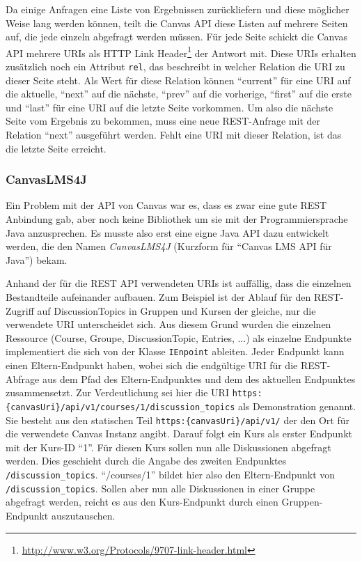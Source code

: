 Da einige Anfragen eine Liste von Ergebnissen zurückliefern und diese möglicher Weise lang werden können, teilt die Canvas API diese Listen auf mehrere Seiten auf, die jede einzeln abgefragt werden müssen. Für jede Seite schickt die Canvas API mehrere URIs als HTTP Link Header\footnote{\url{http://www.w3.org/Protocols/9707-link-header.html}} der Antwort mit. Diese URIs erhalten zusätzlich noch ein Attribut \texttt{rel}, das beschreibt in welcher Relation die URI zu dieser Seite steht.  Als Wert für diese Relation können \enquote{current} für eine URI auf die aktuelle, \enquote{next} auf die nächste, \enquote{prev} auf die vorherige, \enquote{first} auf die erste und \enquote{last} für eine URI auf die letzte Seite vorkommen. Um also die nächste Seite vom Ergebnis zu bekommen, muss eine neue REST-Anfrage mit der Relation \enquote{next} ausgeführt werden. Fehlt eine URI mit dieser Relation, ist das die letzte Seite erreicht. 


\subsubsection{CanvasLMS4J} %
\label{ssub:canvaslms4j}

Ein Problem mit der API von Canvas war es, dass es zwar eine gute REST Anbindung gab, aber noch keine Bibliothek um sie mit der Programmiersprache Java anzusprechen. Es musste also erst eine eigne Java API dazu entwickelt werden, die den Namen \emph{CanvasLMS4J} (Kurzform für \enquote{Canvas LMS API für Java}) bekam. 

Anhand der für die REST API verwendeten URIs ist auffällig, dass die einzelnen Bestandteile aufeinander aufbauen. Zum Beispiel ist der Ablauf für den REST-Zugriff auf DiscussionTopics in Gruppen und Kursen der gleiche, nur die verwendete URI unterscheidet sich. Aus diesem Grund wurden die einzelnen Ressource (Course, Groupe, DiscussionTopic, Entries, ...) als einzelne Endpunkte implementiert die sich von der Klasse \texttt{IEnpoint} ableiten. Jeder Endpunkt kann einen Eltern-Endpunkt haben, wobei sich die endgültige URI für die REST-Abfrage aus dem Pfad des Eltern-Endpunktes und dem des aktuellen Endpunktes zusammensetzt. Zur Verdeutlichung sei hier die URI \texttt{https:\{canvasUri\}/api/v1/courses/1/discussion\_topics} als Demonstration genannt. Sie besteht aus den statischen Teil \texttt{https:\{canvasUri\}/api/v1/} der den Ort für die verwendete Canvas Instanz angibt. Darauf folgt ein Kurs als erster Endpunkt mit der Kurs-ID \enquote{1}. Für diesen Kurs sollen nun alle Diskussionen abgefragt werden. Dies geschieht durch die Angabe des zweiten Endpunktes \texttt{/discussion\_topics}. \enquote{/courses/1} bildet hier also den Eltern-Endpunkt von \texttt{/discussion\_topics}. Sollen aber nun alle Diskussionen in einer Gruppe abgefragt werden, reicht es aus den Kurs-Endpunkt durch einen Gruppen-Endpunkt auszutauschen.

